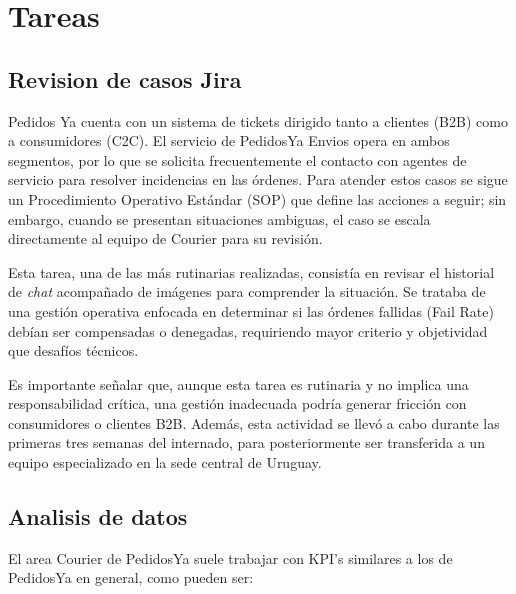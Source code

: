 \section{Tareas}
\subsection{Revision de casos Jira}
Pedidos Ya cuenta con un sistema de tickets dirigido tanto a clientes (B2B) como a consumidores (C2C). El servicio de PedidosYa Envios opera en ambos segmentos, por lo que se solicita frecuentemente el contacto con agentes de servicio para resolver incidencias en las órdenes. Para atender estos casos se sigue un Procedimiento Operativo Estándar (SOP) que define las acciones a seguir; sin embargo, cuando se presentan situaciones ambiguas, el caso se escala directamente al equipo de Courier para su revisión.

Esta tarea, una de las más rutinarias realizadas, consistía en revisar el historial de \textit{chat} acompañado de imágenes para comprender la situación. Se trataba de una gestión operativa enfocada en determinar si las órdenes fallidas (Fail Rate) debían ser compensadas o denegadas, requiriendo mayor criterio y objetividad que desafíos técnicos.

Es importante señalar que, aunque esta tarea es rutinaria y no implica una responsabilidad crítica, una gestión inadecuada podría generar fricción con consumidores o clientes B2B. Además, esta actividad se llevó a cabo durante las primeras tres semanas del internado, para posteriormente ser transferida a un equipo especializado en la sede central de Uruguay.

\subsection{Analisis de datos}

El area Courier de PedidosYa suele trabajar con KPI's similares a los de PedidosYa en general, como pueden ser:

